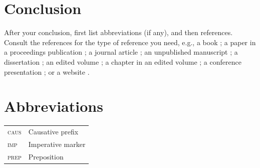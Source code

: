 \section{Conclusion}

After your conclusion, first list abbreviations (if any), and then references. Consult the references for the type of reference you need, e.g., a book \autocite{anderson2007munda}; a paper in a proceedings publication \autocite{delancey2002bodic}; a journal article \autocites{haokip2012thadou, peterson1998lai}; an unpublished manuscript \autocite{hyslop2010kurtop}; a dissertation \autocite{hyslop2011kurtop}; an edited volume \autocite{morey2008neil}; a chapter in an edited volume \autocite{peterson2003lai}; a conference presentation \autocite{post2008tani}; or a website \autocite{sadokpam2008meetei}.

\section*{Abbreviations}

\vspace{-1em} %
\begin{table}[htpb!]
    \begin{tabular}{ll}
    \textsc{caus} & Causative prefix \\
    \textsc{imp} & Imperative marker \\
    \textsc{prep} & Preposition
	\end{tabular}
\end{table}


